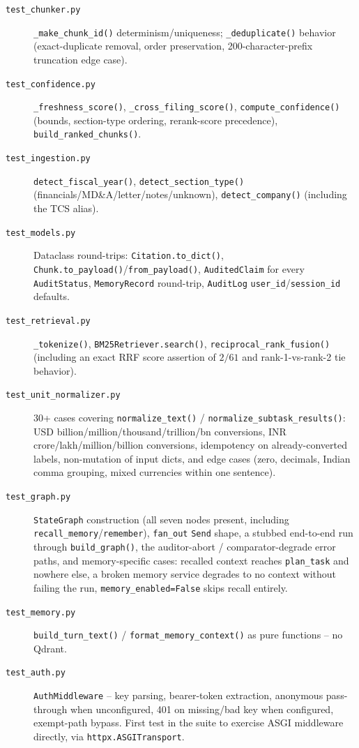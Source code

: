 \documentclass[11pt,a4paper]{report}
\newcommand{\code}[1]{\texttt{#1}}
\newcommand{\file}[1]{\texttt{\small #1}}
\begin{document}
\begin{description}
    \item[\file{test\_chunker.py}] \code{\_make\_chunk\_id()} determinism/uniqueness;
    \code{\_deduplicate()} behavior (exact-duplicate removal, order preservation,
    200-character-prefix truncation edge case).
    \item[\file{test\_confidence.py}] \code{\_freshness\_score()},
    \code{\_cross\_filing\_score()}, \code{compute\_confidence()} (bounds,
    section-type ordering, rerank-score precedence), \code{build\_ranked\_chunks()}.
    \item[\file{test\_ingestion.py}] \code{detect\_fiscal\_year()},
    \code{detect\_section\_type()} (financials/MD\&A/letter/notes/unknown),
    \code{detect\_company()} (including the TCS alias).
    \item[\file{test\_models.py}] Dataclass round-trips: \code{Citation.to\_dict()},
    \code{Chunk.to\_payload()}/\code{from\_payload()}, \code{AuditedClaim} for every
    \code{AuditStatus}, \code{MemoryRecord} round-trip, \code{AuditLog}
    \code{user\_id}/\code{session\_id} defaults.
    \item[\file{test\_retrieval.py}] \code{\_tokenize()}, \code{BM25Retriever.search()},
    \code{reciprocal\_rank\_fusion()} (including an exact RRF score assertion of
    $2/61$ and rank-1-vs-rank-2 tie behavior).
    \item[\file{test\_unit\_normalizer.py}] 30+ cases covering
    \code{normalize\_text()} / \code{normalize\_subtask\_results()}: USD
    billion/million/thousand/trillion/bn conversions, INR
    crore/lakh/million/billion conversions, idempotency on already-converted labels,
    non-mutation of input dicts, and edge cases (zero, decimals, Indian comma
    grouping, mixed currencies within one sentence).
    \item[\file{test\_graph.py}] \code{StateGraph} construction (all seven nodes
    present, including \code{recall\_memory}/\code{remember}), \code{fan\_out}
    \code{Send} shape, a stubbed end-to-end run through \code{build\_graph()},
    the auditor-abort / comparator-degrade error paths, and memory-specific
    cases: recalled context reaches \code{plan\_task} and nowhere else, a
    broken memory service degrades to no context without failing the run,
    \code{memory\_enabled=False} skips recall entirely.
    \item[\file{test\_memory.py}] \code{build\_turn\_text()} /
    \code{format\_memory\_context()} as pure functions -- no Qdrant.
    \item[\file{test\_auth.py}] \code{AuthMiddleware} -- key parsing, bearer-token
    extraction, anonymous pass-through when unconfigured, 401 on missing/bad key
    when configured, exempt-path bypass. First test in the suite to exercise ASGI
    middleware directly, via \code{httpx.ASGITransport}.
\end{description}
\end{document}
